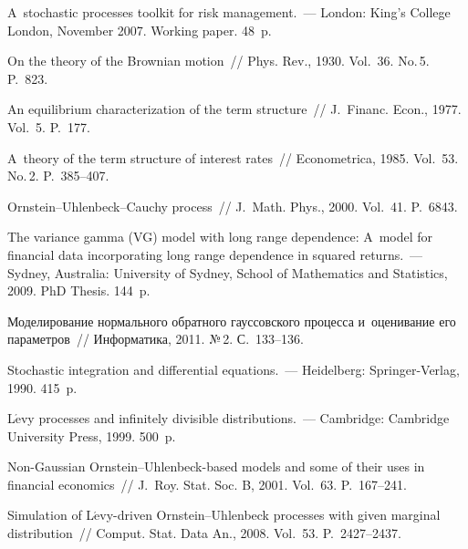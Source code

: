 \begin{multicols}{2}
{\small\frenchspacing
 {%
 \begin{thebibliography}{99}
     A~stochastic 
processes toolkit for risk management.~--- London: King's College 
London, November 2007.  Working paper. 48~p.


 On the theory of the Brownian motion~// 
Phys. Rev., 1930. Vol.~36. No.\,5. P.~823.
    
     An equilibrium characterization of the term structure~// 
J.~Financ. Econ., 1977. Vol.~5. P.~177.

         A~theory of the term 
structure of interest rates~//  Econometrica, 1985. Vol.~53. No.\,2.  P.~385--407.



     Ornstein--Uhlenbeck--Cauchy process~// 
J.~Math. Phys., 2000. Vol.~41. P.~6843.

     The variance gamma (VG) model with long range dependence: 
A~model for financial data incorporating long range dependence in squared 
returns.~--- Sydney, Australia: University of Sydney, School of 
Mathematics and Statistics, 2009. PhD Thesis. 144~p.

     Моделирование нормального обратного гауссовского 
процесса и~оценивание его параметров~// Информатика, 2011. №\,2. С.~133--136.

     Stochastic integration and differential equations.~--- 
Heidelberg: Springer-Verlag, 1990. 415~p.
    
     L$\acute{\mbox{e}}$vy processes and 
    infinitely divisible distributions.~--- Cambridge: Cambridge University Press, 1999.
    500~p.
    
 Non-Gaussian Ornstein--Uhlenbeck-based 
models and some of their uses in financial economics~// 
J.~Roy. Stat. Soc. B, 2001. Vol.~63. P.~167--241.
    
 Simulation of L$\acute{\mbox{e}}$vy-driven 
Ornstein--Uhlenbeck processes with given marginal distribution~// 
Comput. Stat. Data An., 2008. Vol.~53.  P.~2427--2437.


\end{thebibliography}}}
\end{multicols}
